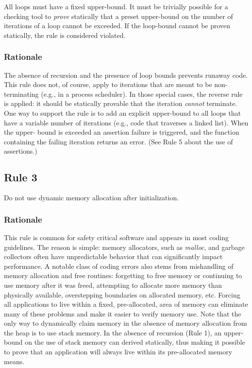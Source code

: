 \documentclass[11pt,oneside]{article}
\begin{document}
All loops must have a fixed upper-bound. It must be trivially possible for a
checking tool to \emph{prove} statically that a preset upper-bound on the
number of iterations of a loop cannot be exceeded. If the loop-bound cannot be
proven statically, the rule is considered violated.

\subsubsection*{Rationale}

The absence of recursion and the presence of loop bounds prevents runaway code.
This rule does not, of course, apply to iterations that are meant to be
non-terminating (e.g., in a process scheduler). In those special cases, the
reverse rule is applied: it should be statically provable that the iteration
\emph{cannot} terminate. One way to support the rule is to add an explicit
upper-bound to all loops that have a variable number of iterations (e.g., code
that traverses a linked list). When the upper- bound is exceeded an assertion
failure is triggered, and the function containing the failing iteration returns
an error. (See Rule 5 about the use of assertions.)

\subsection{Rule 3}

Do not use dynamic memory allocation after initialization.

\subsubsection*{Rationale}

This rule is common for safety critical software and appears in most coding
guidelines. The reason is simple: memory allocators, such as \emph{malloc}, and
garbage collectors often have unpredictable behavior that can significantly
impact performance. A notable class of coding errors also stems from
mishandling of memory allocation and free routines: forgetting to free memory
or continuing to use memory after it was freed, attempting to allocate more
memory than physically available, overstepping boundaries on allocated memory,
etc. Forcing all applications to live within a fixed, pre-allocated, area of
memory can eliminate many of these problems and make it easier to verify memory
use. Note that the only way to dynamically claim memory in the absence of
memory allocation from the heap is to use stack memory. In the absence of
recursion (Rule 1), an upper-bound on the use of stack memory can derived
statically, thus making it possible to prove that an application will always
live within its pre-allocated memory means.
\end{document}
